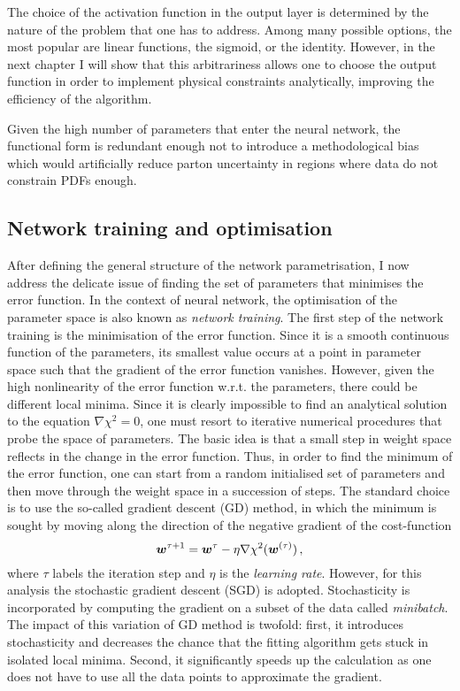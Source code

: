 The choice of the activation function in the output layer is determined by the nature of the problem that one has to address. Among many possible options, the most popular are linear functions, the sigmoid, or the identity. However, in the next chapter I will show that this arbitrariness allows one to choose the output function in order to implement physical constraints analytically, improving the efficiency of the algorithm.%

Given the high number of parameters that enter the neural network, the functional form is redundant enough not to introduce a methodological bias which would artificially reduce parton uncertainty in regions where data do not constrain PDFs enough.


\subsection{Network training and optimisation}
\label{sec:NNtr}
After defining the general structure of the network parametrisation, I now address the delicate issue of finding the set of parameters that minimises the error function. In the context of neural network, the optimisation of the parameter space is also known as \textit{network training}. The first step of the network training is the minimisation of the error function. Since it is a smooth continuous function of the parameters, its smallest value occurs at a point in parameter space such that the gradient of the error function vanishes. However, given the high nonlinearity of the error function w.r.t. the parameters, there could be different local minima. Since it is clearly impossible to find an analytical solution to the equation $\nabla \chi^2 = 0$, one must resort to iterative numerical procedures that probe the space of parameters. The basic idea is that a small step in weight space reflects in the change in the error function. Thus, in order to find the minimum of the error function, one can start from a random initialised set of parameters and then move through the weight space in a succession of steps. The standard choice is to use the so-called gradient descent (GD) method, in which the minimum is sought by moving along the direction of the negative gradient of the cost-function
\begin{equation}
  \vb*{w}^{\tau + 1} = \vb*{w}^{\tau} - \eta \nabla \chi^2 (\vb*{w}^{(\tau)}) \,,
  \label{eq:GD}
\end{equation}
where $\tau$ labels the iteration step and $\eta$ is the \textit{learning rate}. However, for this analysis the stochastic gradient descent (SGD) is adopted. Stochasticity is incorporated by computing the gradient on a subset of the data called \textit{minibatch}. The impact of this variation of GD method is twofold: first, it introduces stochasticity and decreases the chance that the fitting algorithm gets stuck in isolated local minima. Second, it significantly speeds up the calculation as one does not have to use all the data points to approximate the gradient.%

